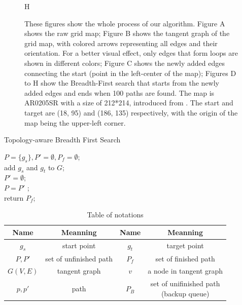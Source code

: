 \documentclass[letterpaper, 10 pt, journal, twoside]{IEEEtran}
\begin{document}
\begin{figure}[t]
\begin{minipage}{.23\linewidth}
  \centerline{H}
\end{minipage}
\vfill
\caption{
These figures show the whole process of our algorithm. Figure A shows the raw grid map; Figure B shows the tangent graph of the grid map, with colored arrows representing all edges and their orientation. For a better visual effect, only edges that form loops are shown in different colors; Figure C shows the newly added edges connecting the start (point in the left-center of the map); Figures D to H show the Breadth-First search that starts from the newly added edges and ends when 100 paths are found. The map is AR0205SR with a size of 212*214, introduced from \cite{sturtevant2012benchmarks}. The start and target are (18, 95) and (186, 135) respectively, with the origin of the map being the upper-left corner.
}
\label{path_search}
\end{figure}

\begin{algorithm}[t] 
 \normalem
\label{a1}
  \caption{Topology-aware Breadth First Search}
  $P = \{g_s\}, P' = \emptyset, P_f = \emptyset$; \\
  add $g_s$ and $g_t$ to $G$; \\
   {
  	 $P' = \emptyset$; \\
      {
     }
     $P = P'$ ; \\		  
  } 
  return $P_f$;
\end{algorithm}

\begin{table}[t]
	\centering  %
	\caption{Table of notations}  %
	\label{table_of_notation}  %
	\begin{tabular}{|c|c|c|c|}  
		\hline 
		Name & Meanning & Name & Meanning \\  
		\hline
		$g_s$   & start point & $g_t$ & target point \\
		\hline
		$P, P'$ & set of unfinished path & $P_f$ & set of finished path \\
		\hline		
		$G(V, E)$ & tangent graph & $v$ & a node in tangent graph \\
		\hline		
		$p, p'$ & path & $P_B$ & \makecell[c]{set of unifinished path \\ (backup queue)} \\
		\hline
	\end{tabular}
\end{table}
\end{document}
